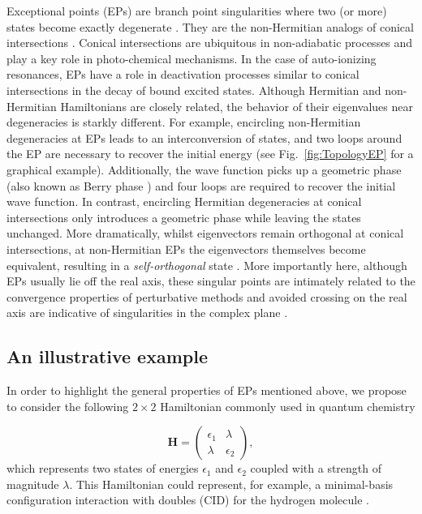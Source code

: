 \documentclass[11pt,a4paper]{article}
\newcommand{\bH}{\mathbf{H}}
\begin{document}
Exceptional points (EPs) are branch point singularities where two (or more) states become exactly degenerate \cite{Heiss_1990, Heiss_1999, Heiss_2012, Heiss_2016}. 
They are the non-Hermitian analogs of conical intersections \cite{Yarkony_1996}.
Conical intersections are ubiquitous in non-adiabatic processes and play a key role in photo-chemical mechanisms.
In the case of auto-ionizing resonances, EPs have a role in deactivation processes similar to conical intersections in the decay of bound excited states.
Although Hermitian and non-Hermitian Hamiltonians are closely related, the behavior of their eigenvalues near degeneracies is starkly different.
For example, encircling non-Hermitian degeneracies at EPs leads to an interconversion of states, and two loops around the EP are necessary to recover the initial energy (see Fig.~\ref{fig:TopologyEP} for a graphical example).
Additionally, the wave function picks up a geometric phase (also known as Berry phase \cite{Berry_1984}) and four loops are required to recover the initial wave function.
In contrast, encircling Hermitian degeneracies at conical intersections only introduces a geometric phase while leaving the states unchanged.
More dramatically, whilst eigenvectors remain orthogonal at conical intersections, at non-Hermitian EPs the eigenvectors themselves become equivalent, resulting in a \textit{self-orthogonal} state \cite{MoiseyevBook}.
More importantly here, although EPs usually lie off the real axis, these singular points are intimately related to the convergence properties of perturbative methods and avoided crossing on the real axis are indicative of singularities in the complex plane \cite{Olsen_1996, Olsen_2000}.

\subsection{An illustrative example}
In order to highlight the general properties of EPs mentioned above, we propose to consider the following $2 \times 2$ Hamiltonian commonly used in quantum chemistry

\begin{equation}
\label{eq:H_2x2}
	\bH = 
	\begin{pmatrix}
		\epsilon_1	&	\lambda	\\
		\lambda		&	\epsilon_2
	\end{pmatrix},
\end{equation}
which represents two states of energies $\epsilon_1$ and $\epsilon_2$ coupled with a strength of magnitude $\lambda$.
This Hamiltonian could represent, for example, a minimal-basis configuration interaction with doubles (CID) for the hydrogen molecule \cite{SzaboBook}.
\end{document}
